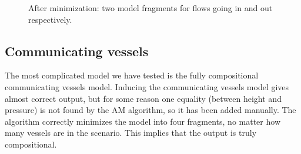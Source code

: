 \documentclass{article} %
\begin{document}


\begin{figure}[ht]
\centering
{}
\caption{After minimization: two model fragments for flows going in and out respectively.}
\label{sb_frags}
\end{figure}

\subsection{Communicating vessels} 

The most complicated model we have tested is the fully compositional
communicating vessels model. Inducing the communicating vessels model gives
almost correct output, but for some reason one equality (between height and pressure) is not
found by the AM algorithm, so it has been added manually.  The algorithm
correctly minimizes the model into four fragments, no matter how many vessels
are in the scenario. This implies that the output is truly compositional.
\end{document}
